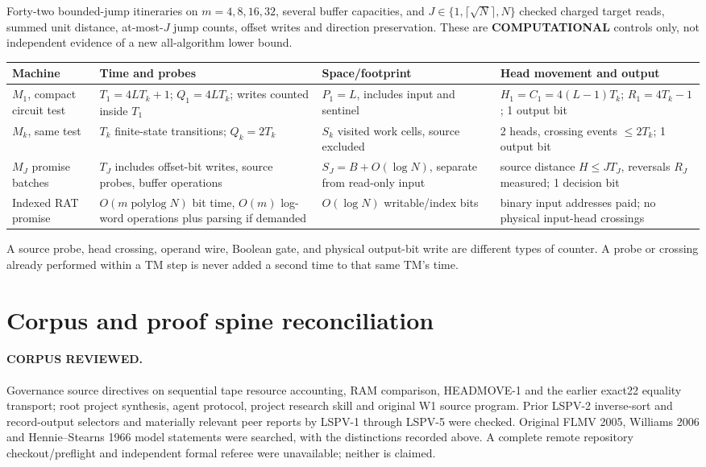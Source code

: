 \documentclass[11pt]{article}
\begin{document}
Forty-two bounded-jump itineraries on $m=4,8,16,32$, several
buffer capacities, and $J\in\{1,\lceil\sqrt{N}\rceil,N\}$
checked charged target reads, summed unit distance, at-most-$J$
jump counts, offset writes and direction preservation. These are
\textbf{COMPUTATIONAL} controls only, not independent evidence of
a new all-algorithm lower bound.

\begin{center}\small
\begin{tabularx}{\linewidth}{lXXX}
\toprule
Machine & Time and probes & Space/footprint & Head movement and output\\
\midrule
$M_1$, compact circuit test & $T_1=4LT_k+1$;
$Q_1=4LT_k$; writes counted inside $T_1$ & $P_1=L$,
includes input and sentinel & $H_1=C_1=4(L-1)T_k$;
$R_1=4T_k-1$; 1 output bit\\
$M_k$, same test & $T_k$ finite-state transitions;
$Q_k=2T_k$ & $S_k$ visited work cells, source excluded &
2 heads, crossing events $\le2T_k$; 1 output bit\\
$M_J$ promise batches & $T_J$ includes offset-bit writes,
source probes, buffer operations & $S_J=B+O(\log N)$, separate
from read-only input & source distance $H\le JT_J$,
reversals $R_J$ measured; 1 decision bit\\
Indexed RAT promise & $O(m\operatorname{polylog}N)$ bit time,
$O(m)$ log-word operations plus parsing if demanded &
$O(\log N)$ writable/index bits & binary input addresses paid;
no physical input-head crossings\\
\bottomrule
\end{tabularx}
\end{center}
A source probe, head crossing, operand wire, Boolean gate, and
physical output-bit write are different types of counter. A probe
or crossing already performed within a TM step is never added a
second time to that same TM's time.

\section{Corpus and proof spine reconciliation}
\paragraph{CORPUS REVIEWED.} Governance source directives on
sequential tape resource accounting, RAM comparison, HEADMOVE-1 and
the earlier exact22 equality transport; root project synthesis,
agent protocol, project research skill and original W1 source program.
Prior LSPV-2 inverse-sort and record-output selectors and materially
relevant peer reports by LSPV-1 through LSPV-5 were checked. Original FLMV 2005,
Williams 2006 and Hennie--Stearns 1966 model statements were
searched, with the distinctions recorded above. A complete
remote repository checkout/preflight and independent formal referee
were unavailable; neither is claimed.
\end{document}
